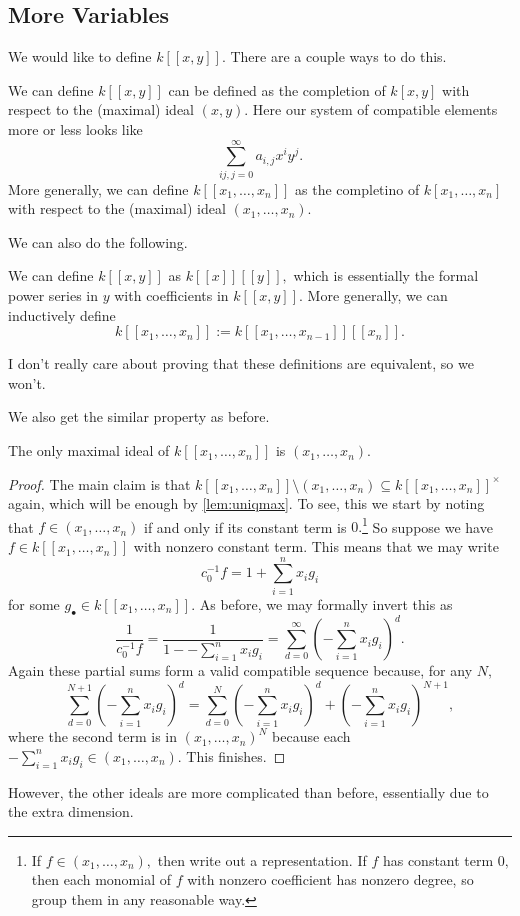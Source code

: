 \documentclass[../notes.tex]{subfiles}
\begin{document}
\subsection{More Variables}
We would like to define $k[[x,y]].$ There are a couple ways to do this.
\begin{definition}
	We can define $k[[x,y]]$ can be defined as the completion of $k[x,y]$ with respect to the (maximal) ideal $(x,y).$ Here our system of compatible elements more or less looks like
	\[\sum_{ij,j=0}^\infty a_{i,j}x^iy^j.\]
	More generally, we can define $k[[x_1,\ldots,x_n]]$ as the completino of $k[x_1,\ldots,x_n]$ with respect to the (maximal) ideal $(x_1,\ldots,x_n).$
\end{definition}
We can also do the following.
\begin{definition}
	We can define $k[[x,y]]$ as $k[[x]][[y]],$ which is essentially the formal power series in $y$ with coefficients in $k[[x,y]].$ More generally, we can inductively define
	\[k[[x_1,\ldots,x_n]]:=k[[x_1,\ldots,x_{n-1}]][[x_n]].\]
\end{definition}
I don't really care about proving that these definitions are equivalent, so we won't.

We also get the similar property as before.
\begin{prop}
	The only maximal ideal of $k[[x_1,\ldots,x_n]]$ is $(x_1,\ldots,x_n).$
\end{prop}
\begin{proof}
	The main claim is that $k[[x_1,\ldots,x_n]]\setminus(x_1,\ldots,x_n)\subseteq k[[x_1,\ldots,x_n]]^\times$ again, which will be enough by \autoref{lem:uniqmax}. To see, this we start by noting that $f\in(x_1,\ldots,x_n)$ if and only if its constant term is $0.$\footnote{If $f\in(x_1,\ldots,x_n),$ then write out a representation. If $f$ has constant term $0,$ then each monomial of $f$ with nonzero coefficient has nonzero degree, so group them in any reasonable way.} So suppose we have $f\in k[[x_1,\ldots,x_n]]$ with nonzero constant term. This means that we may write
	\[c_0^{-1}f=1+\sum_{i=1}^nx_ig_i\]
	for some $g_\bullet\in k[[x_1,\ldots,x_n]].$ As before, we may formally invert this as
	\[\frac1{c_0^{-1}f}=\frac1{1--\sum_{i=1}^nx_ig_i}=\sum_{d=0}^\infty\left(-\sum_{i=1}^nx_ig_i\right)^d.\]
	Again these partial sums form a valid compatible sequence because, for any $N,$
	\[\sum_{d=0}^{N+1}\left(-\sum_{i=1}^nx_ig_i\right)^d=\sum_{d=0}^N\left(-\sum_{i=1}^nx_ig_i\right)^d+\left(-\sum_{i=1}^nx_ig_i\right)^{N+1},\]
	where the second term is in $(x_1,\ldots,x_n)^N$ because each $-\sum_{i=1}^nx_ig_i\in(x_1,\ldots,x_n).$ This finishes.
\end{proof}
However, the other ideals are more complicated than before, essentially due to the extra dimension.
\end{document}

